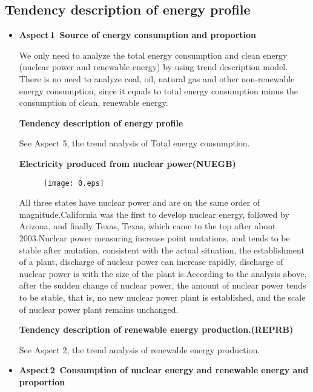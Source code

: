 \subsection{Tendency description of energy profile}
\begin{itemize}
\item \textbf{Aspect\,1 \,Source of energy consumption and proportion}


We only need to analyze the total energy consumption and clean energy (nuclear power and renewable energy)  by using trend description model. There is no need to analyze coal, oil, natural gas and other non-renewable energy consumption, since it equals to total energy consumption minus the consumption of clean, renewable energy.


\textbf{Tendency description of energy profile} 


See Aspect 5, the trend analysis of Total energy consumption.

\textbf{Electricity produced from nuclear power(NUEGB)} 

\begin{figure}[h]

\centering
\texttt{[image: 0.eps]}

\end{figure}


All three states have nuclear power and are on the same order of magnitude.California was the first to develop nuclear energy, followed by Arizona, and finally Texas, Texas, which came to the top after about 2003.Nuclear power measuring increase point mutations, and tends to be stable after mutation, consistent with the actual situation, the establishment of a plant, discharge of nuclear power can increase rapidly, discharge of nuclear power is with the size of the plant is.According to the analysis above, after the sudden change of nuclear power, the amount of nuclear power tends to be stable, that is, no new nuclear power plant is established, and the scale of nuclear power plant remains unchanged.





\textbf{Tendency description of  renewable energy production.(REPRB) } 


See Aspect 2, the trend analysis of  renewable  energy production.




\item \textbf{Aspect\,2 \,Consumption of  nuclear energy and renewable energy and proportion}



\end{itemize}
